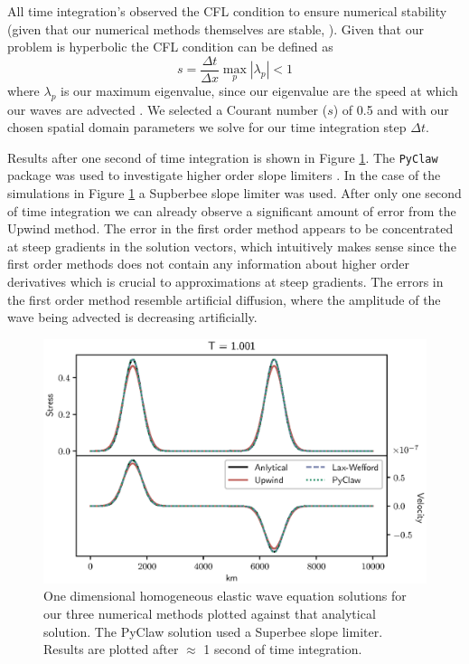 \documentclass[review,onefignum,onetabnum]{siamart171218}
\begin{document}
All time integration's observed the  CFL condition to ensure numerical stability (given that our numerical methods themselves are stable, \cite{leveque_2002}). Given that our problem is hyperbolic the CFL condition can be defined as 
\begin{equation}
    s = \frac{\Delta t}{\Delta x} \max_p |\lambda_p| < 1
\end{equation}
where $\lambda_p$ is our maximum eigenvalue, since our eigenvalue are the speed at which our waves are advected \cite{leveque_2002}. We selected a Courant number ($s$) of 0.5 and with our chosen spatial domain parameters we solve for our time integration step $\Delta t$.

Results after one second of time integration is shown in Figure \ref{fig:homo1sec}. The \texttt{PyClaw} package was used to investigate higher order slope limiters \cite{clawpack}. In the case of the simulations in Figure \ref{fig:homo1sec} a Supberbee slope limiter was used. After only one second  of time integration we can already observe a significant amount of error from the Upwind method. The error in the first order method appears to be concentrated at steep gradients in the solution vectors, which intuitively makes sense since the first order methods does not contain any information about higher order derivatives which is crucial to approximations at steep gradients. The errors in the first order method resemble artificial diffusion, where the amplitude of the wave being advected is decreasing artificially. 
\begin{figure}
    \centering
    \includegraphics[width=\textwidth]{figs/four_methods.eps}
    \caption{One dimensional homogeneous elastic wave equation solutions for our three numerical methods plotted against that analytical solution. The PyClaw solution used a Superbee slope limiter. Results are plotted after $\approx$ 1 second of time integration.}
    \label{fig:homo1sec}
\end{figure}
\end{document}

